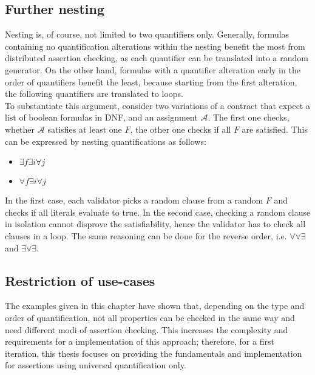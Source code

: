 \subsection{Further nesting}
Nesting is, of course, not limited to two quantifiers only. Generally, formulas containing no quantification alterations within the nesting benefit the most from distributed assertion checking, as each quantifier can be translated into a random generator. On the other hand, formulas with a quantifier alteration early in the order of quantifiers benefit the least, because starting from the first alteration, the following quantifiers are translated to loops.\\
To substantiate this argument, consider two variations of a contract that expect a list of boolean formulas in DNF, and an assignment $\mathcal{A}$. The first one checks, whether $\mathcal{A}$ satisfies at least one $F$, the other one checks if all $F$ are satisfied. This can be expressed by nesting quantifications as follows: 
\begin{itemize}
\item $\exists f \exists i \forall j$
\item $\forall f \exists i \forall j$
\end{itemize}
In the first case, each validator picks a random clause from a random $F$ and checks if all literals evaluate to true. In the second case, checking a random clause in isolation cannot disprove the satisfiability, hence the validator has to check all clauses in a loop. The same reasoning can be done for the reverse order, i.e. $\forall\forall\exists$ and $\exists\forall\exists$.

\subsection{Restriction of use-cases}
The examples given in this chapter have shown that, depending on the type and order of quantification, not all properties can be checked in the same way and need different modi of assertion checking. This increases the complexity and requirements for a implementation of this approach; therefore, for a first iteration, this thesis focuses on providing the fundamentals and implementation for assertions using universal quantification only.

